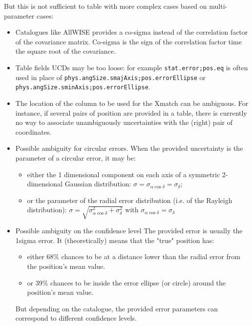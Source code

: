 \documentclass[11pt,a4paper]{ivoa}
\begin{document}
But this is not sufficient to table with more complex cases based on multi-parameter cases: 

\begin{itemize}
	\item Catalogues like AllWISE provides a co-sigma instead of the correlation factor of the covariance matrix.
	Co-sigma is the sign of the correlation factor time the square root of the covariance.
	\item Table fields UCDs  may be too loose: for example  \texttt{stat.error;pos.eq} is often used in place of \texttt{phys.angSize.smajAxis;pos.errorEllipse} or \texttt{phys.angSize.sminAxis;pos.errorEllipse}.
	\item The location  of the column to be used for the Xmatch can be ambiguous. For instance, if several pairs of position are provided in a table, there is currently 
	no way to associate unambiguously uncertainties with the (right) pair of coordinates.
	\item  Possible ambiguity for circular errors. When the provided uncertainty is the parameter of a circular error, it may be:
	\begin{itemize}
		\item either the 1 dimensional component on each axis of a symmetric 2-dimensional Gaussian distribution: $\sigma=\sigma_{\alpha\cos\delta}=\sigma_\delta$;
		\item or the parameter of the radial error distribution (i.e. of the Rayleigh distribution): $\sigma=\sqrt{\sigma_{\alpha\cos\delta}^2 + \sigma_\delta^2}$
                 with $\sigma_{\alpha\cos\delta} = \sigma_\delta$ 
         \end{itemize}

	\item   Possible ambiguity on the confidence level
	The provided error is usually the 1sigma error.
	It (theoretically) means that the "true" position has:
	\begin{itemize}	
		\item either 68\% chances to be at a distance lower than the radial error from the position's mean value.
		\item or 39\% chances to be inside the error ellipse (or circle) around the position's mean value.
	\end{itemize}
	But depending on the catalogue, the provided error parameters can correspond to different confidence levels.

\end{itemize}
\end{document}
